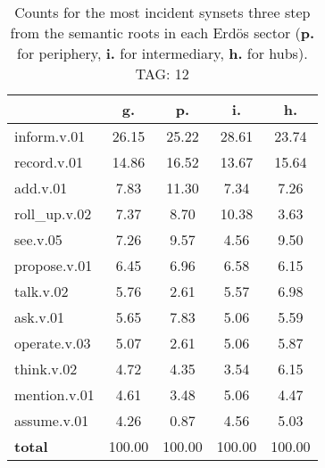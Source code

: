 \begin{table}[h!]
\begin{center}
\begin{tabular}{| l | c | c | c | c |}\hline
 & g. & p. & i. & h. \\\hline
inform.v.01 & 26.15  & 25.22  & 28.61  & 23.74 \\\hline
record.v.01 & 14.86  & 16.52  & 13.67  & 15.64 \\\hline
add.v.01 & 7.83  & 11.30  & 7.34  & 7.26 \\\hline
roll\_up.v.02 & 7.37  & 8.70  & 10.38  & 3.63 \\\hline
see.v.05 & 7.26  & 9.57  & 4.56  & 9.50 \\\hline
propose.v.01 & 6.45  & 6.96  & 6.58  & 6.15 \\\hline
talk.v.02 & 5.76  & 2.61  & 5.57  & 6.98 \\\hline
ask.v.01 & 5.65  & 7.83  & 5.06  & 5.59 \\\hline
operate.v.03 & 5.07  & 2.61  & 5.06  & 5.87 \\\hline
think.v.02 & 4.72  & 4.35  & 3.54  & 6.15 \\\hline
mention.v.01 & 4.61  & 3.48  & 5.06  & 4.47 \\\hline
assume.v.01 & 4.26  & 0.87  & 4.56  & 5.03 \\\hline
{{\bf total}} & 100.00  & 100.00  & 100.00  & 100.00 \\\hline
\end{tabular}
\caption{Counts for the most incident synsets three step from the semantic roots in each Erd\"os sector ({\bf p.} for periphery, {\bf i.} for intermediary, {\bf h.} for hubs). TAG: 12}
\end{center}
\end{table}